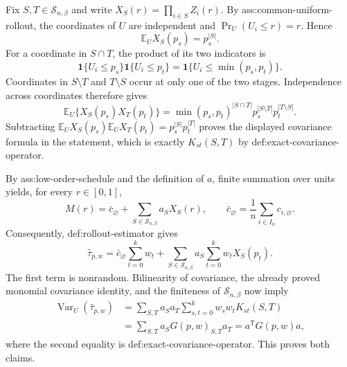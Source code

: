 Fix \(S,T\in\mathcal S_{n,\beta}\) and write \(X_S(r)=\prod_{i\in S}Z_i(r)\).  By ass:common-uniform-rollout, the coordinates of \(U\) are independent and \(\Pr_U(U_i\le r)=r\).  Hence
\[
\mathbb E_U X_S(p_s)=p_s^{|S|}.
\]
For a coordinate in \(S\cap T\), the product of its two indicators is
\[
\mathbf 1\{U_i\le p_s\}\mathbf 1\{U_i\le p_t\}
=\mathbf 1\{U_i\le \min(p_s,p_t)\}.
\]
Coordinates in \(S\setminus T\) and \(T\setminus S\) occur at only one of the two stages.  Independence across coordinates therefore gives
\[
\mathbb E_U\{X_S(p_s)X_T(p_t)\}
=\min(p_s,p_t)^{|S\cap T|}p_s^{|S\setminus T|}p_t^{|T\setminus S|}.
\]
Subtracting \(\mathbb E_U X_S(p_s)\mathbb E_U X_T(p_t)=p_s^{|S|}p_t^{|T|}\) proves the displayed covariance formula in the statement, which is exactly \(K_{st}(S,T)\) by def:exact-covariance-operator.

By ass:low-order-schedule and the definition of \(a\), finite summation over units yields, for every \(r\in[0,1]\),
\[
M(r)=\bar c_{\varnothing}+\sum_{S\in\mathcal S_{n,\beta}}a_SX_S(r),
\qquad
\bar c_{\varnothing}=\frac1n\sum_{i\in I_n}c_{i,\varnothing}.
\]
Consequently, def:rollout-estimator gives
\[
\widehat\tau_{p,w}
=\bar c_{\varnothing}\sum_{t=0}^kw_t
+\sum_{S\in\mathcal S_{n,\beta}}a_S\sum_{t=0}^kw_tX_S(p_t).
\]
The first term is nonrandom.  Bilinearity of covariance, the already proved monomial covariance identity, and the finiteness of \(\mathcal S_{n,\beta}\) now imply
\[
\begin{aligned}
\operatorname{Var}_U(\widehat\tau_{p,w})
&=\sum_{S,T}a_Sa_T\sum_{s,t=0}^kw_sw_tK_{st}(S,T)\\
&=\sum_{S,T}a_SG(p,w)_{S,T}a_T
=a^{\mathsf T}G(p,w)a,
\end{aligned}
\]
where the second equality is def:exact-covariance-operator.  This proves both claims.